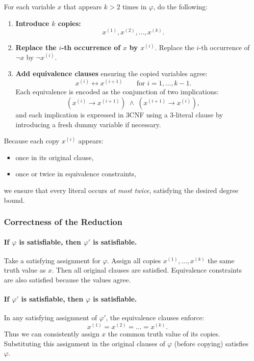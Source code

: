 \documentclass[9pt]{extarticle}
\begin{document}
For each variable $x$ that appears $k > 2$ times in $\varphi$, do the following:
\begin{enumerate}
    \item \textbf{Introduce $k$ copies:}
    \[
        x^{(1)}, x^{(2)}, \dots, x^{(k)}.
    \]
    \item \textbf{Replace the $i$-th occurrence of $x$ by $x^{(i)}$}.  
          Replace the $i$-th occurrence of $\neg x$ by $\neg x^{(i)}$.
    \item \textbf{Add equivalence clauses} ensuring the copied variables agree:
    \[
    x^{(i)} \leftrightarrow x^{(i+1)}
    \qquad\text{for } i=1,\dots,k-1.
    \]
    Each equivalence is encoded as the conjunction of two implications:
    \[
    (x^{(i)} \rightarrow x^{(i+1)}) \;\land\;
    (x^{(i+1)} \rightarrow x^{(i)}),
    \]
    and each implication is expressed in 3CNF using a 3-literal clause by
    introducing a fresh dummy variable if necessary.
\end{enumerate}

Because each copy $x^{(i)}$ appears:
\begin{itemize}
    \item once in its original clause,
    \item once or twice in equivalence constraints,
\end{itemize}
we ensure that every literal occurs \emph{at most twice}, satisfying the desired
degree bound.

\subsubsection*{Correctness of the Reduction}

\paragraph{If $\varphi$ is satisfiable, then $\varphi'$ is satisfiable.}
Take a satisfying assignment for $\varphi$.  
Assign all copies $x^{(1)}, \dots, x^{(k)}$ the same truth value as $x$.
Then all original clauses are satisfied.  
Equivalence constraints are also satisfied because the values agree.

\paragraph{If $\varphi'$ is satisfiable, then $\varphi$ is satisfiable.}
In any satisfying assignment of $\varphi'$, the equivalence clauses enforce:
\[
x^{(1)} = x^{(2)} = \dots = x^{(k)}.
\]
Thus we can consistently assign $x$ the common truth value of its copies.
Substituting this assignment in the original clauses of $\varphi$ (before
copying) satisfies $\varphi$.
\end{document}
